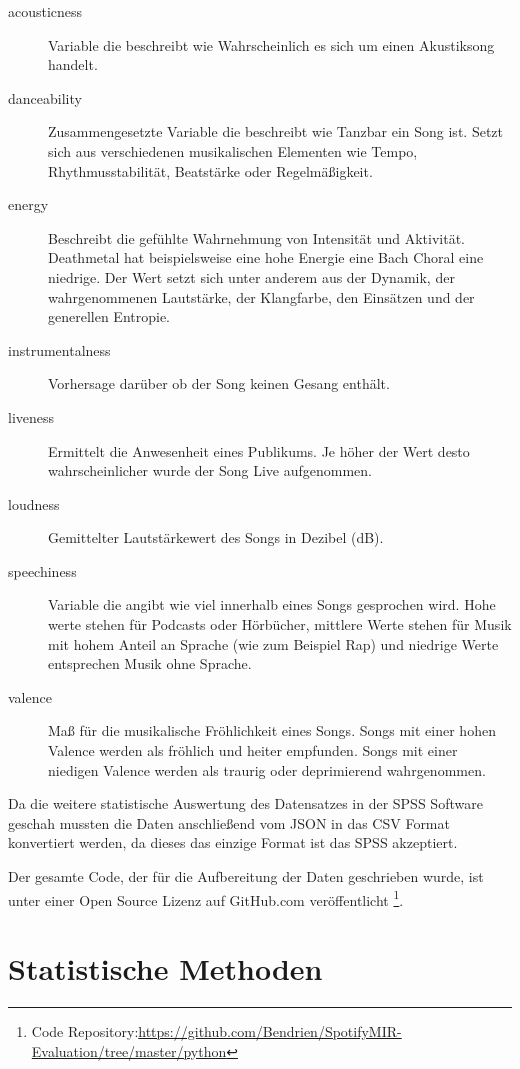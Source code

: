 \begin{description}
    \item[acousticness] Variable die beschreibt wie Wahrscheinlich es sich um einen Akustiksong handelt.
    \item[danceability] Zusammengesetzte Variable die beschreibt wie Tanzbar ein Song ist. Setzt sich aus verschiedenen musikalischen Elementen wie Tempo, Rhythmusstabilität, Beatstärke oder Regelmäßigkeit.
    \item[energy] Beschreibt die gefühlte Wahrnehmung von Intensität und Aktivität. Deathmetal hat beispielsweise eine hohe Energie eine Bach Choral eine niedrige. Der Wert setzt sich unter anderem aus der Dynamik, der wahrgenommenen Lautstärke, der Klangfarbe, den Einsätzen und der generellen Entropie.
    \item[instrumentalness] Vorhersage darüber ob der Song keinen Gesang enthält.
    \item[liveness] Ermittelt die Anwesenheit eines Publikums. Je höher der Wert desto wahrscheinlicher wurde der Song Live aufgenommen.
    \item[loudness] Gemittelter Lautstärkewert des Songs in Dezibel (dB).
    \item[speechiness] Variable die angibt wie viel innerhalb eines Songs gesprochen wird. Hohe werte stehen für Podcasts oder Hörbücher, mittlere Werte stehen für Musik mit hohem Anteil an Sprache (wie zum Beispiel Rap) und niedrige Werte entsprechen Musik ohne Sprache. 
    \item[valence] Maß für die musikalische Fröhlichkeit eines Songs. Songs mit einer hohen Valence werden als fröhlich und heiter empfunden. Songs mit einer niedigen Valence werden als traurig oder deprimierend wahrgenommen.
\end{description}

Da die weitere statistische Auswertung des Datensatzes in der SPSS Software geschah mussten die Daten anschließend vom JSON in das CSV Format konvertiert werden, da dieses das einzige Format ist das SPSS akzeptiert.

Der gesamte Code, der für die Aufbereitung der Daten geschrieben wurde, ist unter einer Open Source Lizenz auf GitHub.com veröffentlicht \footnote{Code Repository:\hfill \url{https://github.com/Bendrien/SpotifyMIR-Evaluation/tree/master/python}}.



\section*{Statistische Methoden}
\label{sec:Statistische Methoden}

